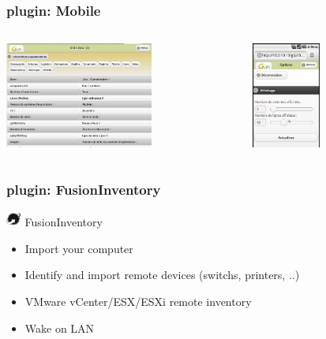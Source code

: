 \documentclass{beamer}
\begin{document}
\begin{frame}
    \frametitle{plugin: Mobile}

 \begin{columns}
 \begin{column}{0.5\textwidth}
    \includegraphics[height=3.5cm]{./pics/mobile/computer_detail_tablet.jpg}
 \end{column}
 \begin{column}{0.5\textwidth}
   \includegraphics[height=3.5cm]{./pics/mobile/options.jpg}
 \end{column}
\end{columns}

\end{frame}



\begin{frame}
    \frametitle{plugin: FusionInventory}


    \begin{block}{\includegraphics[height=0.5cm]{./pics/plugins/fusioninventory.jpg} FusionInventory}
        \begin{itemize}
            \item Import your computer
            \item Identify and import remote devices (switchs, printers, ..)
            \item VMware vCenter/ESX/ESXi remote inventory
            \item Wake on LAN
        \end{itemize}
    \end{block}

\end{frame}
\end{document}
